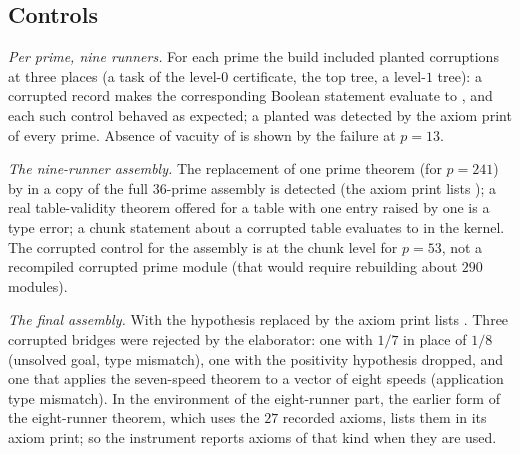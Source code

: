 \documentclass[11pt]{article}
\theoremstyle{remark}
\begin{document}
\subsection{Controls}
\emph{Per prime, nine runners.} For each prime the build included planted corruptions at three places (a task of the level-$0$ certificate, the top tree, a level-$1$ tree): a corrupted record makes the corresponding Boolean statement evaluate to , and each such control behaved as expected; a planted  was detected by the axiom print of every prime. Absence of vacuity of  is shown by the failure at $p=13$.

\emph{The nine-runner assembly.} The replacement of one prime theorem (for $p=241$) by  in a copy of the full $36$-prime assembly is detected (the axiom print lists ); a real table-validity theorem offered for a table with one entry raised by one is a type error; a chunk statement about a corrupted table evaluates to  in the kernel. The corrupted control for the assembly is at the chunk level for $p=53$, not a recompiled corrupted prime module (that would require rebuilding about $290$ modules).

\emph{The final assembly.} With the hypothesis  replaced by  the axiom print lists . Three corrupted bridges were rejected by the elaborator: one with $1/7$ in place of $1/8$ (unsolved goal, type mismatch), one with the positivity hypothesis dropped, and one that applies the seven-speed theorem to a vector of eight speeds (application type mismatch). In the environment of the eight-runner part, the earlier form of the eight-runner theorem, which uses the $27$ recorded axioms, lists them in its axiom print; so the instrument reports axioms of that kind when they are used.
\end{document}
